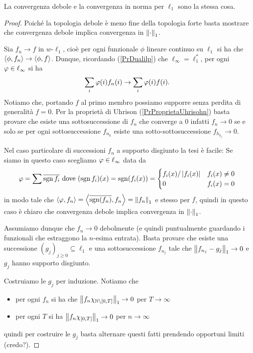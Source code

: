 \begin{proposition}\label{PrConvergenzaForteEDeboleCoincidonoSul1}
La convergenza debole e la convergenza in norma per $\ell_1$ sono la stessa cosa.
\end{proposition}
\begin{proof}
Poich\'e la topologia debole \`e meno fine della topologia forte basta mostrare che convergenza debole implica convergenza in ${\left\Vert{\cdot}\right\Vert}_1$.

Sia $f_n\to f$ in $w$-$\ell_1$, cio\`e per ogni funzionale $\phi$ lineare continuo su $\ell_1$ si ha che $\left\langle {\phi,f_n}\right\rangle\to\left\langle {\phi,f}\right\rangle$. Dunque, ricordando (\ref{PrDualilp}) che $\ell_\infty=\ell_1^\ast$, per ogni $\varphi\in\ell_\infty$ si ha
\[\sum_i\varphi(i)f_n(i)\to \sum_i\varphi(i)f(i).\]
Notiamo che, portando $f$ al primo membro possiamo supporre senza perdita di generalit\`a $f=0$. Per la propriet\`a di Uhrison (\ref{PrProprietaUhrisohn}) basta provare che esiste una sottosuccessione di $f_n$ che converge a $0$ infatti $f_n\to 0$ se e solo se per ogni sottosuccessione $f_{n_k}$ esiste una sotto-sottosuccessione $f_{h_{k_j}}\to 0$.

Nel caso particolare di successioni $f_n$ a supporto disgiunto la tesi \`e facile: Se siamo in questo caso scegliamo $\varphi\in\ell_\infty$ data da 
\[\varphi=\sum \overline{\operatorname{sgn} f_i}\text{ dove }(\operatorname{sgn} f_i)(x)=\operatorname{sgn}(f_i(x))=\begin{cases}
    f_i(x)/\left|{f_i(x)}\right| & f_i(x)\neq 0\\
    0 & f_i(x)=0
\end{cases}\] 
in modo tale che $\left\langle {\varphi,f_n}\right\rangle=\left\langle {\overline{\operatorname{sgn}(f_n)},f_n}\right\rangle=\left\Vert{f_n}\right\Vert_1$ e stesso per $f$, quindi in questo caso \`e chiaro che convergenza debole implica convergenza in ${\left\Vert{\cdot}\right\Vert}_1$.

Assumiamo dunque che $f_n\to 0$ debolmente (e quindi puntualmente guardando i funzionali che estraggono la $n$-esima entrata). Basta provare che esiste una successione $(g_j)_{j\geq 0}\subseteq \ell_1$ e una sottosuccessione $f_{n_j}$ tale che $\left\Vert{f_{n_j}-g_j}\right\Vert_1\to 0$ e $g_j$ hanno supporto disgiunto. 

Costruiamo le $g_j$ per induzione. Notiamo che 
\begin{itemize}
    \item per ogni $f_n$ si ha che $\left\Vert{f_n\chi_{\mathbb{N}\setminus[0,T]}}\right\Vert_1\to 0$ per $T\to\infty$
    \item per ogni $T$ si ha $\left\Vert{f_n\chi_{[0,T]}}\right\Vert_1\to 0$ per $n\to \infty$
\end{itemize}
quindi per costruire le $g_j$ basta alternare questi fatti prendendo opportuni limiti (credo?).
\end{proof}

